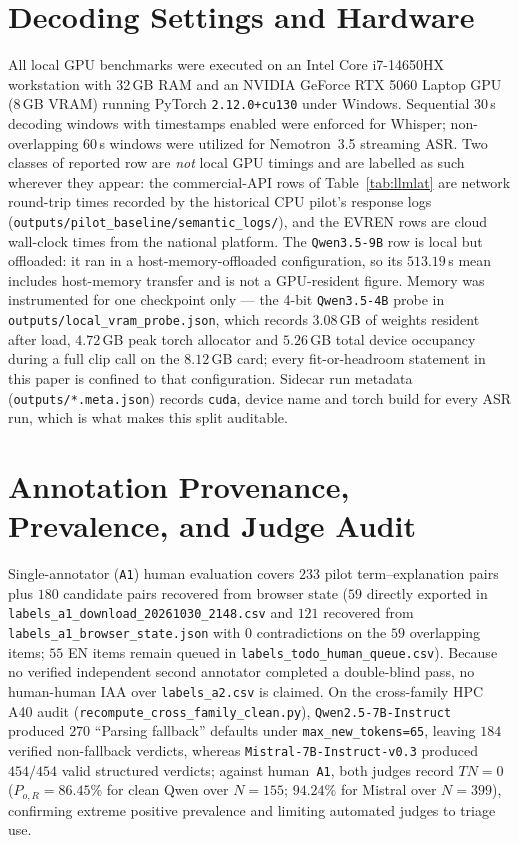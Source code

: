 \documentclass[conference]{IEEEtran}
\begin{document}
\section{Decoding Settings and Hardware}
\label{app:hw}

All local GPU benchmarks were executed on an Intel Core i7-14650HX workstation with 32\,GB RAM and an NVIDIA GeForce RTX 5060 Laptop GPU (8\,GB VRAM) running PyTorch \texttt{2.12.0+cu130} under Windows. Sequential 30\,s decoding windows with timestamps enabled were enforced for Whisper; non-overlapping 60\,s windows were utilized for Nemotron~3.5 streaming ASR. Two classes of reported row are \emph{not} local GPU timings and are labelled as such wherever they appear: the commercial-API rows of Table~\ref{tab:llmlat} are network round-trip times recorded by the historical CPU pilot's response logs (\texttt{outputs/pilot\_baseline/semantic\_logs/}), and the EVREN rows are cloud wall-clock times from the national platform. The \texttt{Qwen3.5-9B} row is local but offloaded: it ran in a host-memory-offloaded configuration, so its $513.19$\,s mean includes host-memory transfer and is not a GPU-resident figure. Memory was instrumented for one checkpoint only --- the 4-bit \texttt{Qwen3.5-4B} probe in \texttt{outputs/local\_vram\_probe.json}, which records $3.08$\,GB of weights resident after load, $4.72$\,GB peak torch allocator and $5.26$\,GB total device occupancy during a full clip call on the $8.12$\,GB card; every fit-or-headroom statement in this paper is confined to that configuration. Sidecar run metadata (\texttt{outputs/*.meta.json}) records \texttt{cuda}, device name and torch build for every ASR run, which is what makes this split auditable.

\section{Annotation Provenance, Prevalence, and Judge Audit}
\label{app:iaa}

Single-annotator (\texttt{A1}) human evaluation covers $233$ pilot term--explanation pairs plus $180$ candidate pairs recovered from browser state ($59$ directly exported in \texttt{labels\_a1\_download\_20261030\_2148.csv} and $121$ recovered from \texttt{labels\_a1\_browser\_state.json} with $0$ contradictions on the $59$ overlapping items; $55$ EN items remain queued in \texttt{labels\_todo\_human\_queue.csv}). Because no verified independent second annotator completed a double-blind pass, no human-human IAA over \texttt{labels\_a2.csv} is claimed. On the cross-family HPC A40 audit (\texttt{recompute\_cross\_family\_clean.py}), \texttt{Qwen2.5-7B-Instruct} produced $270$ ``Parsing fallback'' defaults under \texttt{max\_new\_tokens=65}, leaving $184$ verified non-fallback verdicts, whereas \texttt{Mistral-7B-Instruct-v0.3} produced $454/454$ valid structured verdicts; against human~\texttt{A1}, both judges record $TN=0$ ($P_{o,R}=86.45\%$ for clean Qwen over $N=155$; $94.24\%$ for Mistral over $N=399$), confirming extreme positive prevalence and limiting automated judges to triage use.
\end{document}
